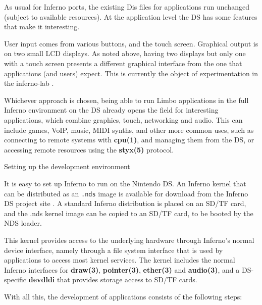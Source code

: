 \documentclass[11pt]{p9article}
\makeatletter
\renewcommand\subsection{\@startsection {subsection}{1}{\z@} {3pt}
{1pt} {\normalfont\normalsize\bfseries}}
\makeatother
\begin{document}
As usual for Inferno ports, the existing Dis files for applications run unchanged (subject to available resources).
At the application level the DS has some features that make it interesting.

User input comes from various buttons, and the touch screen.
Graphical output is on two small LCD displays.  As noted above,
having two displays but only one with a touch screen
presents a different graphical interface from the one that
applications (and users) expect.
This is currently the object of experimentation in the inferno-lab \cite{caerwyn-ipn}.

Whichever approach is chosen, being able to run Limbo applications in the full
Inferno environment on the DS already opens the field for interesting applications, which combine
graphics, touch, networking and audio.
This can include games, VoIP, music, MIDI synths, and
other more common uses, such as connecting to remote systems with \textbf{cpu(1)},
and managing them from the DS,
or accessing remote resources using the \textbf{styx(5)} protocol.
		
\subsection{Setting up the development environment}

It is easy to set up Inferno to run on the Nintendo DS.
An Inferno kernel that can be distributed as an \texttt{.nds} image is
available for download from the Inferno DS project site \cite{inferno-ds}.
A standard Inferno distribution is placed on an SD/TF card,
and the .nds kernel image can be copied to an SD/TF card, to be booted by the NDS loader.

This kernel provides access to the underlying hardware through Inferno's normal device interface,
namely through a file system interface that is used by applications to
access most kernel services.
The kernel includes the normal Inferno interfaces for \textbf{draw(3)}, \textbf{pointer(3)}, \textbf{ether(3)} and \textbf{audio(3)},
and a DS-specific \textbf{devdldi} that provides storage access to SD/TF cards.

With all this, the development of applications consists of the following steps:
\end{document}
